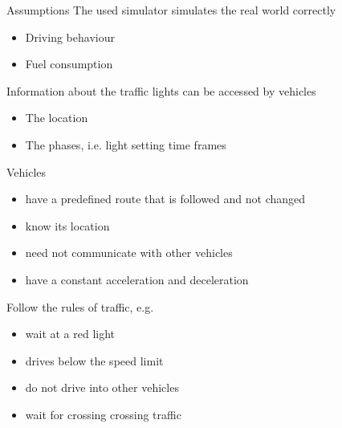 \begin{frame}{Assumptions}
The used simulator simulates the real world correctly
\begin{itemize}
\item Driving behaviour
\item Fuel consumption
\end{itemize}
Information about the traffic lights can be accessed by vehicles
\begin{itemize}
\item The location
\item The phases, i.e. light setting time frames 
\end{itemize}

Vehicles 
\begin{itemize}
\item have a predefined route that is followed and not changed
\item know its location
\item need not communicate with other vehicles
\item have a constant acceleration and deceleration
\end{itemize}

Follow the rules of traffic, e.g. 
\begin{itemize}
\item wait at a red light
\item drives below the speed limit
\item do not drive into other vehicles
\item wait for crossing crossing traffic
\end{itemize}

\end{frame}
